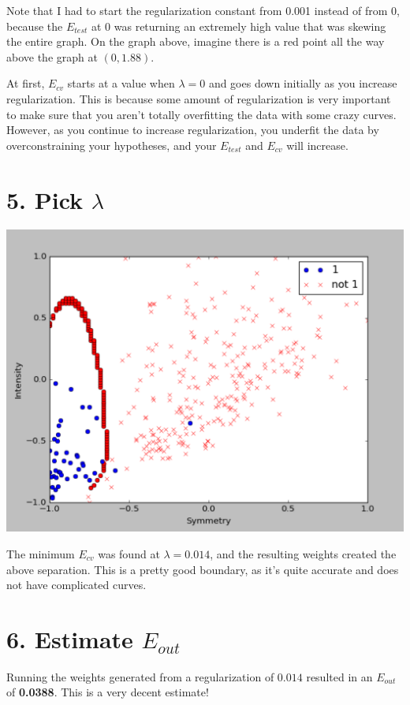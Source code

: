 \documentclass[12pt]{article}
\begin{document}
Note that I had to start the regularization constant from 0.001 instead of from 0, because the $E_{test}$ at 0 was returning an extremely high value that was skewing the entire graph. On the graph above, imagine there is a red point all the way above the graph at $(0, 1.88)$.

At first, $E_{cv}$ starts at a value when $\lambda = 0$ and goes down initially as you increase regularization. This is because some amount of regularization is very important to make sure that you aren't totally overfitting the data with some crazy curves. However, as you continue to increase regularization, you underfit the data by overconstraining your hypotheses, and your $E_{test}$ and $E_{cv}$ will increase.

\section*{5. Pick $\lambda$}
\includegraphics[scale=.5]{5-1.png}

The minimum $E_{cv}$ was found at $\lambda = 0.014$, and the resulting weights created the above separation. This is a pretty good boundary, as it's quite accurate and does not have complicated curves.

\section*{6. Estimate $E_{out}$}
Running the weights generated from a regularization of $0.014$ resulted in an $E_{out}$ of \textbf{0.0388}. This is a very decent estimate!
\end{document}

